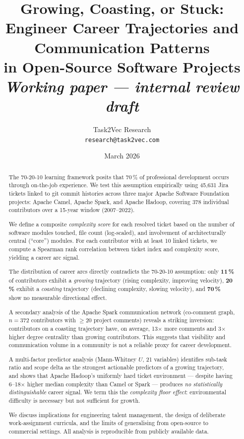 \documentclass[12pt,a4paper]{article}
\title{%
  \textbf{Growing, Coasting, or Stuck:}\\
  Engineer Career Trajectories and Communication Patterns\\
  in Open-Source Software Projects\\[6pt]
  \large\textit{Working paper — internal review draft}
}
\author{%
  Task2Vec Research\\
  \small\texttt{research@task2vec.com}
}
\date{March 2026}
\begin{document}
\maketitle
\thispagestyle{empty}

\begin{abstract}
The 70-20-10 learning framework posits that 70\,\% of professional
development occurs through on-the-job experience.
We test this assumption empirically using 45,631 Jira tickets
linked to git commit histories across three major Apache Software
Foundation projects: Apache Camel, Apache Spark, and Apache Hadoop,
covering 378 individual contributors over a 15-year window (2007–2022).

We define a composite \emph{complexity score} for each resolved ticket
based on the number of software modules touched, file count (log-scaled),
and involvement of architecturally central (``core'') modules.
For each contributor with at least 10 linked tickets, we compute a
Spearman rank correlation between ticket index and complexity score,
yielding a career arc signal.

The distribution of career arcs directly contradicts the 70-20-10
assumption: only \textbf{11\,\%} of contributors exhibit a
\emph{growing} trajectory (rising complexity, improving velocity),
\textbf{20\,\%} exhibit a \emph{coasting} trajectory (declining
complexity, slowing velocity), and \textbf{70\,\%} show no measurable
directional effect.

A secondary analysis of the Apache Spark communication network
(co-comment graph, $n=372$ contributors with $\geq20$ project
comments) reveals a striking inversion: contributors on a coasting
trajectory have, on average, 13$\times$ more comments and 3$\times$
higher degree centrality than growing contributors.
This suggests that visibility and communication volume in a
community is not a reliable proxy for career development.

A multi-factor predictor analysis (Mann-Whitney $U$, 21 variables)
identifies sub-task ratio and scope delta as the strongest actionable
predictors of a growing trajectory, and shows that Apache Hadoop's
uniformly hard ticket environment --- despite having 6--18$\times$
higher median complexity than Camel or Spark --- produces
\textit{no statistically distinguishable} career signal.
We term this the \textit{complexity floor effect}: environmental
difficulty is necessary but not sufficient for growth.

We discuss implications for engineering talent management,
the design of deliberate work-assignment curricula, and the
limits of generalising from open-source to commercial settings.
All analysis is reproducible from publicly available data.
\end{abstract}
\end{document}
